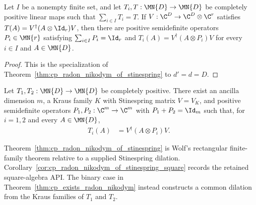 \begin{corollary}
    \label{cor:cp_radon_nikodym_of_stinespring_square}
    \leanok
    Let $I$ be a nonempty finite set, and let
    $T_i,T:\MN{D}\to\MN{D}$ be completely positive linear maps such that
    $\sum_{i\in I}T_i=T$. If
    $V:\C^D\to\C^D\otimes\C^r$ satisfies
    $T(A)=V^\dagger(A\otimes\Id_r)V$, then there are positive semidefinite
    operators $P_i\in\MN{r}$ satisfying
    $\sum_{i\in I}P_i=\Id_r$ and
    $T_i(A)=V^\dagger(A\otimes P_i)V$ for every $i\in I$ and $A\in\MN{D}$.
\end{corollary}

\begin{proof}\leanok
    This is the specialization of
    Theorem~\ref{thm:cp_radon_nikodym_of_stinespring} to $d'=d=D$.
\end{proof}

\begin{theorem}
    \label{thm:cp_exists_radon_nikodym}
    \leanok
    Let $T_1,T_2:\MN{D}\to\MN{D}$ be completely positive. There exist
    an ancilla dimension $m$, a Kraus family $K$ with Stinespring matrix
    $V=V_K$, and positive semidefinite operators
    $P_1,P_2:\C^m\to\C^m$ with $P_1+P_2=\Id_m$ such that, for
    $i=1,2$ and every $A\in\MN{D}$,
    \begin{align}
        T_i(A)
        &=V^\dagger(A\otimes P_i)V.
        \label{eq:representations_binary_radon}
    \end{align}
\end{theorem}

\begin{remark}
    \label{rem:cp_radon_nikodym_scope}
    Theorem~\ref{thm:cp_radon_nikodym_of_stinespring} is Wolf's rectangular
    finite-family theorem relative to a supplied Stinespring dilation.
    Corollary~\ref{cor:cp_radon_nikodym_of_stinespring_square} records the
    retained square-algebra API. The binary case in
    Theorem~\ref{thm:cp_exists_radon_nikodym} instead constructs a common
    dilation from the Kraus families of $T_1$ and $T_2$.
\end{remark}

